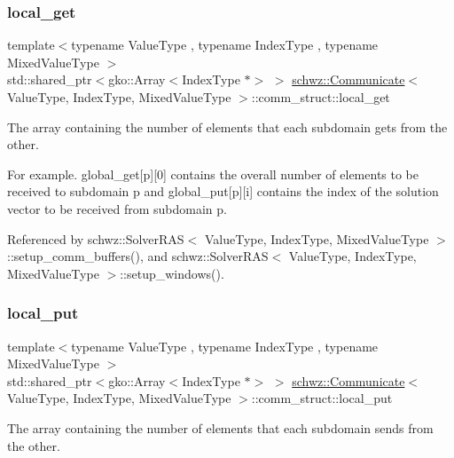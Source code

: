 \subsubsection{\texorpdfstring{local\+\_\+get}{local\_get}}
{\footnotesize\ttfamily template$<$typename Value\+Type , typename Index\+Type , typename Mixed\+Value\+Type $>$ \\
std\+::shared\+\_\+ptr$<$gko\+::\+Array$<$Index\+Type $\ast$$>$ $>$ \hyperlink{classschwz_1_1Communicate}{schwz\+::\+Communicate}$<$ Value\+Type, Index\+Type, Mixed\+Value\+Type $>$\+::comm\+\_\+struct\+::local\+\_\+get}



The array containing the number of elements that each subdomain gets from the other. 

For example. global\+\_\+get\mbox{[}p\mbox{]}\mbox{[}0\mbox{]} contains the overall number of elements to be received to subdomain p and global\+\_\+put\mbox{[}p\mbox{]}\mbox{[}i\mbox{]} contains the index of the solution vector to be received from subdomain p. 

Referenced by schwz\+::\+Solver\+R\+A\+S$<$ Value\+Type, Index\+Type, Mixed\+Value\+Type $>$\+::setup\+\_\+comm\+\_\+buffers(), and schwz\+::\+Solver\+R\+A\+S$<$ Value\+Type, Index\+Type, Mixed\+Value\+Type $>$\+::setup\+\_\+windows().

\mbox{\label{structschwz_1_1Communicate_1_1comm__struct_ace7588b81dd2aa7a84e118df8137252b}} 
\subsubsection{\texorpdfstring{local\+\_\+put}{local\_put}}
{\footnotesize\ttfamily template$<$typename Value\+Type , typename Index\+Type , typename Mixed\+Value\+Type $>$ \\
std\+::shared\+\_\+ptr$<$gko\+::\+Array$<$Index\+Type $\ast$$>$ $>$ \hyperlink{classschwz_1_1Communicate}{schwz\+::\+Communicate}$<$ Value\+Type, Index\+Type, Mixed\+Value\+Type $>$\+::comm\+\_\+struct\+::local\+\_\+put}



The array containing the number of elements that each subdomain sends from the other. 

